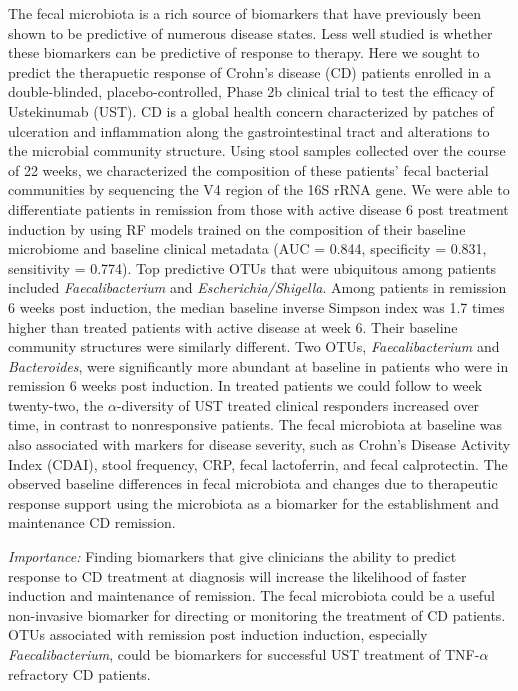 \documentclass[11pt,]{article}
\begin{document}
The fecal microbiota is a rich source of biomarkers that have previously
been shown to be predictive of numerous disease states. Less well
studied is whether these biomarkers can be predictive of response to
therapy. Here we sought to predict the therapuetic response of Crohn's
disease (CD) patients enrolled in a double-blinded, placebo-controlled,
Phase 2b clinical trial to test the efficacy of Ustekinumab (UST). CD is
a global health concern characterized by patches of ulceration and
inflammation along the gastrointestinal tract and alterations to the
microbial community structure. Using stool samples collected over the
course of 22 weeks, we characterized the composition of these patients'
fecal bacterial communities by sequencing the V4 region of the 16S rRNA
gene. We were able to differentiate patients in remission from those
with active disease 6 post treatment induction by using RF models
trained on the composition of their baseline microbiome and baseline
clinical metadata (AUC = 0.844, specificity = 0.831, sensitivity =
0.774). Top predictive OTUs that were ubiquitous among patients included
\emph{Faecalibacterium} and \emph{Escherichia/Shigella}. Among patients
in remission 6 weeks post induction, the median baseline inverse Simpson
index was 1.7 times higher than treated patients with active disease at
week 6. Their baseline community structures were similarly different.
Two OTUs, \emph{Faecalibacterium} and \emph{Bacteroides}, were
significantly more abundant at baseline in patients who were in
remission 6 weeks post induction. In treated patients we could follow to
week twenty-two, the \({\alpha}\)-diversity of UST treated clinical
responders increased over time, in contrast to nonresponsive patients.
The fecal microbiota at baseline was also associated with markers for
disease severity, such as Crohn's Disease Activity Index (CDAI), stool
frequency, CRP, fecal lactoferrin, and fecal calprotectin. The observed
baseline differences in fecal microbiota and changes due to therapeutic
response support using the microbiota as a biomarker for the
establishment and maintenance CD remission.

\emph{Importance:} Finding biomarkers that give clinicians the ability
to predict response to CD treatment at diagnosis will increase the
likelihood of faster induction and maintenance of remission. The fecal
microbiota could be a useful non-invasive biomarker for directing or
monitoring the treatment of CD patients. OTUs associated with remission
post induction induction, especially \emph{Faecalibacterium}, could be
biomarkers for successful UST treatment of TNF-\({\alpha}\) refractory
CD patients.
\end{document}
